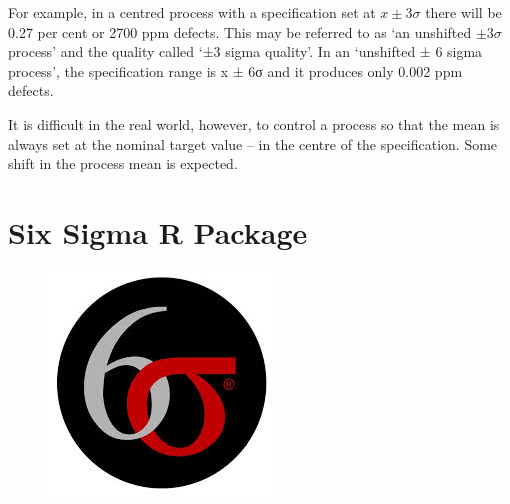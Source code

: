 \documentclass[MASTER-SPC.tex]{subfiles}
\begin{document}
	For example, in a centred process with a specification set at $x \pm 3\sigma$ there
	will be 0.27 per cent or 2700 ppm defects. This may be referred to as ‘an
	unshifted $\pm 3\sigma$ process’ and the quality called ‘±3 sigma quality’. In an ‘unshifted ± 6 sigma process’, the specification range is x ± 6σ and it produces only 0.002 ppm defects.
	
	It is difficult in the real world, however, to control a process so that the
	mean is always set at the nominal target value – in the centre of the
	specification. Some shift in the process mean is expected.
	
	
	
%	
%	
%	
%	
%	
%	
%	
%	
%	

\newpage
\section{Six Sigma R Package}
\begin{figure}[h!]
\centering
\includegraphics[width=0.4\linewidth]{./sixsigmalogo}
\end{figure}
\end{document}
